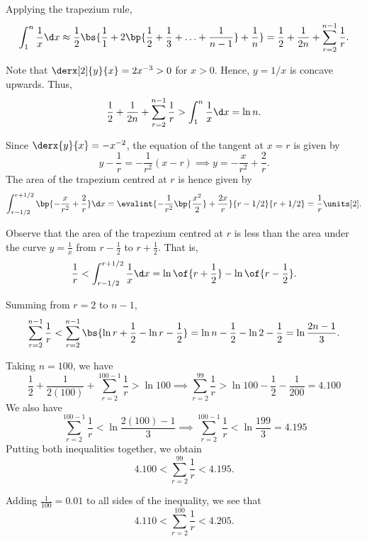 \begin{solution}
    \begin{ppart}
        Applying the trapezium rule, \[\int_1^n \frac1x \d x \approx \frac12 \bs{\frac11 + 2\bp{\frac12 + \frac13 + \ldots + \frac1{n-1}} + \frac1n} = \frac12 + \frac1{2n} + \sum_{r=2}^{n-1} \frac1r.\]

        Note that $\derx[2]{y}{x} = 2x^{-3} > 0$ for $x > 0$. Hence, $y = 1/x$ is concave upwards. Thus, \[\frac12 + \frac1{2n} + \sum_{r=2}^{n-1} \frac1r > \int_1^n \frac1x \d x = \ln n.\]
    \end{ppart}
    \begin{ppart}
        Since $\derx{y}{x} = -x^{-2}$, the equation of the tangent at $x = r$ is given by \[y - \frac1r = -\frac1{r^2} (x - r) \implies y = -\frac{x}{r^2} + \frac2r.\] The area of the trapezium centred at $r$ is hence given by \[\int_{r-1/2}^{r + 1/2} \bp{-\frac{x}{r^2} + \frac2r} \d x = \evalint{-\frac1{r^2} \bp{\frac{x^2}2} + \frac{2x}r}{r-1/2}{r + 1/2} = \frac1r \units[2].\]

        Observe that the area of the trapezium centred at $r$ is less than the area under the curve $y = \frac1x$ from $r - \frac12$ to $r + \frac12$. That is, \[\frac1r < \int_{r - 1/2}^{r + 1/2} \frac1x \d x = \ln\of{r + \frac12} - \ln\of{r - \frac12}.\]

        Summing from $r = 2$ to $n-1$, \[\sum_{r = 2}^{n-1} \frac1r < \sum_{r=2}^{n-1} \bs{\ln{r + \frac12} - \ln{r - \frac12}} = \ln{n - \frac12} - \ln{2 - \frac12} = \ln{\frac{2n - 1}{3}}.\]
    \end{ppart}
    \begin{ppart}
        Taking $n = 100$, we have
        \[
            \frac12 + \frac1{2 (100)} + \sum_{r=2}^{100 - 1} \frac1{r} > \ln 100 \implies \sum_{r=2}^{99} \frac1{r} > \ln 100 - \frac12 - \frac1{200} = 4.100
        \]
        We also have
        \[
            \sum_{r = 2}^{100 - 1} \frac1r <\ln{\frac{2 (100) - 1}{3}} \implies \sum_{r = 2}^{100 - 1} \frac1r < \ln{\frac{199}3} = 4.195
        \]
        Putting both inequalities together, we obtain \[4.100 < \sum_{r = 2}^{99} \frac1r < 4.195.\]

        Adding $\frac1{100} = 0.01$ to all sides of the inequality, we see that \[4.110 < \sum_{r = 2}^{100} \frac1r < 4.205.\]
    \end{ppart}
\end{solution}